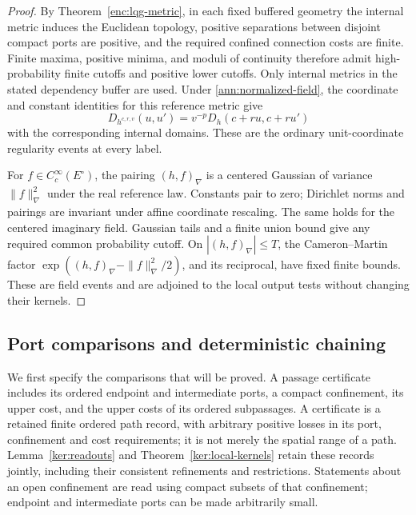 \documentclass[11pt]{article}
\numberwithin{equation}{section}
\theoremstyle{definition}
\theoremstyle{remark}
\newcommand{\1}{\mathbf 1}
\begin{document}
\begin{proof}
By Theorem~\ref{enc:lqg-metric}, in each fixed buffered geometry
the internal metric induces the Euclidean topology, positive
separations between disjoint compact ports are positive, and the
required confined connection costs are finite.  Finite maxima,
positive minima, and moduli of continuity therefore admit
high-probability finite cutoffs and positive lower cutoffs.
Only internal metrics in the stated dependency buffer are used.
Under \eqref{ann:normalized-field}, the coordinate and constant
identities for this reference metric give
\[
 D_{h^{c,r,v}}(u,u')
       =v^{-p}D_h(c+ru,c+ru')
\]
with the corresponding internal domains.  These are the ordinary
unit-coordinate regularity events at every label.

For \(f\in C_c^\infty(E^\circ)\), the pairing
\((h,f)_\nabla\) is a centered Gaussian of variance
\(\|f\|_\nabla^2\) under the real reference law.  Constants pair
to zero; Dirichlet norms and pairings are invariant under affine
coordinate rescaling.  The same holds for the centered imaginary
field.  Gaussian tails and a finite union bound give any required
common probability cutoff.  On \(|(h,f)_\nabla|\le T\), the
Cameron--Martin factor
\(\exp((h,f)_\nabla-\|f\|_\nabla^2/2)\), and its reciprocal,
have fixed finite bounds.  These are field events and are adjoined
to the local output tests without changing their kernels.
\end{proof}


\subsection{Port comparisons and deterministic chaining}

We first specify the comparisons that will be proved.  A passage
certificate includes its ordered endpoint and intermediate ports, a
compact confinement, its upper cost, and the upper costs of its ordered
subpassages.  A certificate is a retained finite ordered path record, with arbitrary
positive losses in its port, confinement and cost requirements; it is
not merely the spatial range of a path.  Lemma~\ref{ker:readouts} and
Theorem~\ref{ker:local-kernels} retain these records jointly, including
their consistent refinements and restrictions.  Statements about
an open confinement are read using compact subsets of that confinement;
endpoint and intermediate ports can be made arbitrarily small.
\end{document}
